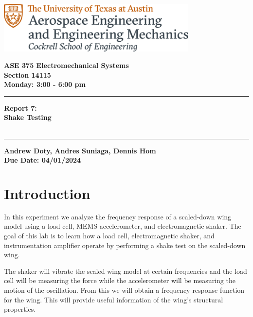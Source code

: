 \documentclass{article}
\begin{document}
\begin{titlepage}
  \centering
  \includegraphics[width=10cm]{ase-logo-formal.png}  %
  \vspace{1cm}  %
 
  \Large \textbf{ASE 375 Electromechanical Systems}\\
  \large \textbf{Section 14115}\\
  \vspace{0.5cm}
  \textbf{Monday: 3:00 - 6:00 pm}\\
 
  \vspace{1cm}
 
  \hrule
  \vspace{0.5cm}
 
  \Huge \textbf{Report 7:\\
    Shake Testing}\\
  \Huge \textbf{}\\
 
  \vspace{0.5cm}
  \hrule
 
  \vspace{1cm}
 
  \normalsize \textbf{Andrew Doty, Andres Suniaga, Dennis Hom}\\
  \normalsize \textbf{Due Date: 04/01/2024}
 
\end{titlepage}
\newpage

\tableofcontents
\thispagestyle{empty}
\newpage

\section{Introduction}
In this experiment we analyze the frequency response of a scaled-down wing model using a load cell, MEMS accelerometer, and electromagnetic shaker. The goal of this lab is to learn how a load cell, electromagnetic shaker, and instrumentation amplifier operate by performing a shake test on the scaled-down wing.
\vspace{2.5mm}

The shaker will vibrate the scaled wing model at certain frequencies and the load cell will be measuring the force while the accelerometer will be measuring the motion of the oscillation. From this we will obtain a frequency response function for the wing. This will provide useful information of the wing's structural properties.
\end{document}
